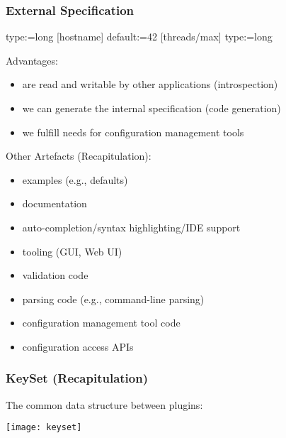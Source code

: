 \begin{frame}[fragile]
	\frametitle{External Specification}

	\begin{code}[gobble=4]
	[port]
	type:=long
	[hostname]
	default:=42
	[threads/max]
	type:=long
	\end{code}

	\vspace{1em}

	Advantages:
	\pause
	\begin{itemize}
	\item are read and writable by other applications (introspection)
	\item we can generate the internal specification (code generation)
	\item we fulfill needs for configuration management tools
	\end{itemize}
\end{frame}

\begin{frame}
	Other Artefacts (Recapitulation):

	\pause

	\begin{itemize}
	\item examples (e.g., defaults)
	\item documentation
	\item auto-completion/syntax highlighting/IDE support
	\item tooling (GUI, Web UI)
	\item validation code
	\item parsing code (e.g., command-line parsing)
	\item configuration management tool code
	\item configuration access APIs
	\end{itemize}
\end{frame}

\begin{frame}
	\frametitle{KeySet (Recapitulation)}

	The common data structure between plugins:
	\vspace{1cm}

	\texttt{[image: keyset]}
\end{frame}


